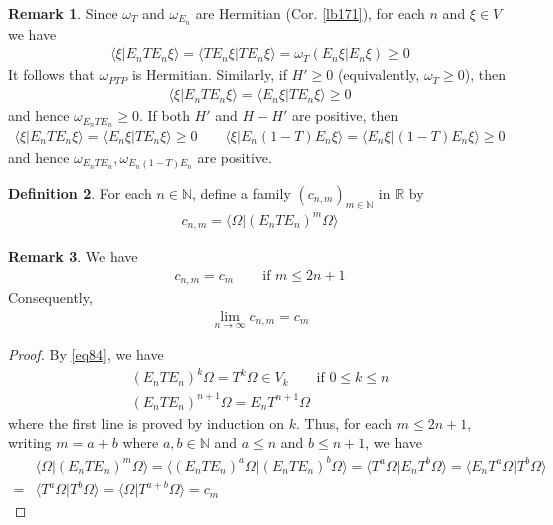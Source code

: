 \documentclass[12pt,b5paper,notitlepage]{article}
\theoremstyle{definition}
\newtheorem{df}{Definition}[section]
\newtheorem{rem}[df]{Remark}
\theoremstyle{plain}
\newcommand{\bk}[1]{\langle {#1}\rangle}
\newcommand{\Nbb}{\mathbb N}
\newcommand{\Rbb}{\mathbb R}
\numberwithin{equation}{section}
\begin{document}
\begin{rem}\label{lb173}
Since $\omega_T$ and $\omega_{E_n}$ are Hermitian (Cor. \ref{lb171}), for each $n$ and $\xi\in V$ we have
\begin{align*}
\bk{\xi|E_nTE_n\xi}=\bk{TE_n\xi|TE_n\xi}=\omega_T(E_n\xi|E_n\xi)\geq0
\end{align*}
It follows that $\omega_{PTP}$ is Hermitian. Similarly, if $H'\geq0$ (equivalently, $\omega_T\geq0$), then
\begin{align*}
\bk{\xi|E_nTE_n\xi}=\bk{E_n\xi|TE_n\xi}\geq0
\end{align*}
and hence $\omega_{E_nTE_n}\geq0$. If both $H'$ and $H-H'$ are positive, then 
\begin{align*}
\bk{\xi|E_nTE_n\xi}=\bk{E_n\xi|TE_n\xi}\geq0\qquad\bk{\xi|E_n(1-T)E_n\xi}=\bk{E_n\xi|(1-T)E_n\xi}\geq0
\end{align*}
and hence $\omega_{E_nTE_n},\omega_{E_n(1-T)E_n}$ are positive.
\end{rem}


\begin{df}
For each $n\in\Nbb$, define a family $(c_{n,m})_{m\in\Nbb}$ in $\Rbb$ by
\begin{align}
c_{n,m}=\bk{\Omega|(E_nTE_n)^m\Omega}
\end{align}
\end{df}

\begin{rem}\label{lb185}
We have
\begin{align}\label{eq83}
c_{n,m}=c_m\qquad\text{if }m\leq 2n+1
\end{align}
Consequently,
\begin{align}\label{eq90}
\lim_{n\rightarrow\infty}c_{n,m}=c_m
\end{align}
\end{rem}

\begin{proof}
By \eqref{eq84}, we have 
\begin{subequations}\label{eq102}
\begin{gather}
(E_nTE_n)^k\Omega=T^k\Omega\in V_k\qquad \text{if }0\leq k\leq n\\
(E_nTE_n)^{n+1}\Omega=E_nT^{n+1}\Omega
\end{gather}
\end{subequations}
where the first line is proved by induction on $k$. Thus, for each $m\leq 2n+1$, writing $m=a+b$ where $a,b\in\Nbb$ and $a\leq n$ and $b\leq n+1$, we have
\begin{align*}
&\bk{\Omega|(E_nTE_n)^m\Omega}=\bk{(E_nTE_n)^a\Omega|(E_nTE_n)^b\Omega}=\bk{T^a\Omega|E_nT^b\Omega}=\bk{E_nT^a\Omega|T^b\Omega}\\
=&\bk{T^a\Omega|T^b\Omega}=\bk{\Omega|T^{a+b}\Omega}=c_m
\end{align*}
\end{proof}
\end{document}
